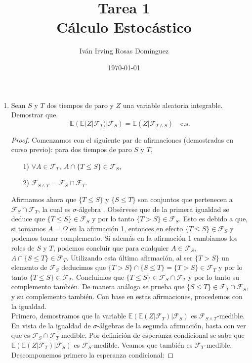 \documentclass[letterpaper]{article}
\title{\textbf{Tarea 1\\ Cálculo Estocástico}}
\author{Iván Irving Rosas Domínguez}
\date{\today}
\newcommand{\F}{\mathcal{F}}
\newcommand{\E}{\mathbb{E}}
\newcommand{\1}{\mathds{1}}
\theoremstyle{definition}
\theoremstyle{definition}
\theoremstyle{definition}
\theoremstyle{definition}
\theoremstyle{definition}
\begin{document}
\maketitle


\begin{enumerate} 
    \item Sean \(S\) y \(T\) dos tiempos de paro y \(Z\) una variable aleatoria
    integrable. Demostrar que
    \[
        \E\left(\E(Z|\F_T)|\F_S\right)=\E(Z|\F_{T\wedge S}) \quad \text{c.s.}
        \]
    \begin{proof}
            Comenzamos con el siguiente par de afirmaciones (demostradas en curso previo): para dos tiempos de paro $S$ y $T$,
            \begin{enumerate}
                \item [1)] $\forall A\in \F_T,\ A\cap\{T\leq S\}\in \F_S$,
                \item [2)]$\F_{S\wedge T}=\F_S\cap\F_T$.
            \end{enumerate}
            
            Afirmamos ahora que $\{T\leq S\}$ y $\{S\leq T\}$ son conjuntos que pertenecen a $\F_{S}\cap \F_T$, la cual es $\sigma$-álgebra . 
            Obsérvese que de la primera igualdad se deduce que $\{T\leq S\}\in \F_S$ y por lo tanto $\{T>S\}\in \F_S$. 
            Esto es debido a que, si tomamos $A=\Omega$ en la afirmación 1, entonces en efecto $\{T\leq S\}\in \F_S$ y podemos tomar complemento.
            Si además en la afirmación 1 cambiamos los roles de $S$ y $T$, podemos concluir que
            para cualquier $A\in \F_S$, $A\cap\{S\leq T\}\in \F_T$.
            Utilizando esta última afirmación, al ser $\{T>S\}$ un elemento de $\F_S$ deducimos que $\{T>S\}\cap\{S\leq T\}=\{T>S\}\in \F_T$ y 
            por lo tanto $\{T\leq S\}\in \F_T$. Concluimos que $\{T\leq S\}\in \F_S\cap\F_T$ y por lo tanto su complemento también. De manera análoga
            se prueba que $\{S\leq T\} \in \F_T\cap\F_S$, y su complemento también.
            Con base en estas afirmaciones, procedemos con la igualdad. \\
            
            Primero, demostramos que la variable $\E\left(\E \left(Z|\F_T\right)|\F_S\right)$
            es $\F_{S\wedge T}$-medible. En vista de la igualdad de $\sigma$-álgebras de la segunda afirmación, basta con ver que es $\F_S\cap \F_T$-medible.
            Por definición de esperanza condicional se sabe que $\E\left(\E \left(Z|\F_T\right)|\F_S\right)$ es 
            $\F_S$-medible. Veamos que también es $\F_T$-medible. Descomponemos primero la esperanza condicional:
        

\end{proof}
\end{enumerate}
\end{document}
